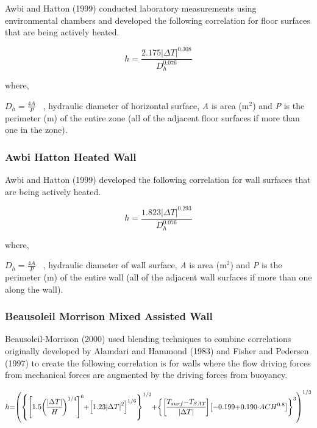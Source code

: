 Awbi and Hatton (1999) conducted laboratory measurements using environmental chambers and developed the following correlation for floor surfaces that are being actively heated.

\begin{equation}
h = \frac{{2.175{{\left| {\Delta T} \right|}^{0.308}}}}{{D_h^{0.076}}}
\end{equation}

where,

\({D_h} = \frac{{4A}}{P}\) ~, hydraulic diameter of horizontal surface, \emph{A} is area (m\(^{2}\)) and \emph{P} is the perimeter (m) of the entire zone (all of the adjacent floor surfaces if more than one in the zone).

\subsubsection{Awbi Hatton Heated Wall}\label{awbi-hatton-heated-wall}

Awbi and Hatton (1999) developed the following correlation for wall surfaces that are being actively heated.

\begin{equation}
h = \frac{{1.823{{\left| {\Delta T} \right|}^{0.293}}}}{{D_h^{0.076}}}
\end{equation}

where,

\({D_h} = \frac{{4A}}{P}\) ~, hydraulic diameter of wall surface, \emph{A} is area (m\(^{2}\)) and \emph{P} is the perimeter (m) of the entire wall (all of the adjacent wall surfaces if more than one along the wall).

\subsubsection{Beausoleil Morrison Mixed Assisted Wall}\label{beausoleil-morrison-mixed-assisted-wall}

Beausoleil-Morrison (2000) used blending techniques to combine correlations originally developed by Alamdari and Hammond (1983) and Fisher and Pedersen (1997) to create the following correlation is for walls where the flow driving forces from mechanical forces are augmented by the driving forces from buoyancy.

\begin{equation}
\medmuskip=0mu
\thinmuskip=0mu
\thickmuskip=0mu
\nulldelimiterspace=0pt
\scriptspace=0pt
h = \left( 
\left\{
\left[1.5\left(\frac{\left|\Delta T\right|}{H}\right)^{1/4}\right]^6 +
\left[1.23\left|\Delta T\right|^2\right]^{1/6}
\right\}^{1/2} + 
\left\{
\left[\frac{T_{surf}-T_{SAT}}{\left|\Delta T\right|}\right]
\left[-0.199+0.190\cdot ACH^{0.8}\right]
\right\}^3
\right)^{1/3}
\end{equation}

